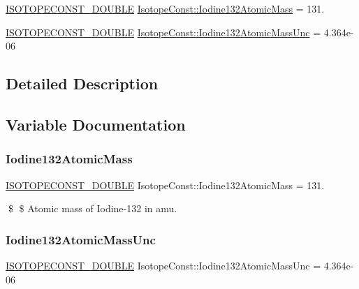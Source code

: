 \begin{DoxyCompactItemize}
\item 
\mbox{\hyperlink{group___isotope_const-_macros_ga8f45a7272ce02c0b4c65c44636ed719a}{I\+S\+O\+T\+O\+P\+E\+C\+O\+N\+S\+T\+\_\+\+D\+O\+U\+B\+LE}} \mbox{\hyperlink{group___isotope_const-_iodine-_i132_ga83d27c23b3ce55f57aa4f0116b26e2d8}{Isotope\+Const\+::\+Iodine132\+Atomic\+Mass}} = 131.
\item 
\mbox{\hyperlink{group___isotope_const-_macros_ga8f45a7272ce02c0b4c65c44636ed719a}{I\+S\+O\+T\+O\+P\+E\+C\+O\+N\+S\+T\+\_\+\+D\+O\+U\+B\+LE}} \mbox{\hyperlink{group___isotope_const-_iodine-_i132_ga839ed08aadb58b9db140293116632617}{Isotope\+Const\+::\+Iodine132\+Atomic\+Mass\+Unc}} = 4.\+364e-\/06
\end{DoxyCompactItemize}


\subsection{Detailed Description}


\subsection{Variable Documentation}
\mbox{\label{group___isotope_const-_iodine-_i132_ga83d27c23b3ce55f57aa4f0116b26e2d8}} 
\subsubsection{\texorpdfstring{Iodine132\+Atomic\+Mass}{Iodine132AtomicMass}}
{\footnotesize\ttfamily \mbox{\hyperlink{group___isotope_const-_macros_ga8f45a7272ce02c0b4c65c44636ed719a}{I\+S\+O\+T\+O\+P\+E\+C\+O\+N\+S\+T\+\_\+\+D\+O\+U\+B\+LE}} Isotope\+Const\+::\+Iodine132\+Atomic\+Mass = 131.}

\$ \$ Atomic mass of Iodine-\/132 in amu. \mbox{\label{group___isotope_const-_iodine-_i132_ga839ed08aadb58b9db140293116632617}} 
\subsubsection{\texorpdfstring{Iodine132\+Atomic\+Mass\+Unc}{Iodine132AtomicMassUnc}}
{\footnotesize\ttfamily \mbox{\hyperlink{group___isotope_const-_macros_ga8f45a7272ce02c0b4c65c44636ed719a}{I\+S\+O\+T\+O\+P\+E\+C\+O\+N\+S\+T\+\_\+\+D\+O\+U\+B\+LE}} Isotope\+Const\+::\+Iodine132\+Atomic\+Mass\+Unc = 4.\+364e-\/06}

